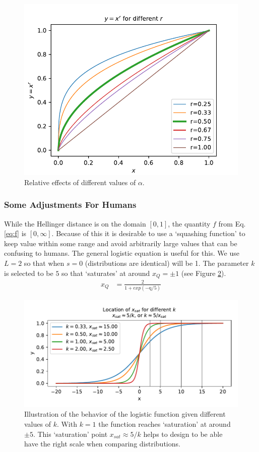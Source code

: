 \begin{figure}[tbp]
    \centering
    \includegraphics[width=0.90\linewidth]{Figures/power_comparison}
    \caption{Relative effects of different values of $\alpha$.}
    \label{fig:alphas}
\end{figure}

\subsubsection{Some Adjustments For Humans}
While the Hellinger distance is on the domain $[0,1]$, the quantity $f$ from Eq. \ref{eq:f} is $[0,\infty]$. Because of this it is desirable to use a `squashing function' to keep \xQ{} value within some range and avoid arbitrarily large values that can be confusing to humans. The general logistic equation is useful for this.
We use $L=2$ so that when $s=0$ (distributions are identical) \xQ{} will be 1. The parameter $k$ is selected to be $5$ so that \xQ{} `saturates' at around $x_Q=\pm1$ (see Figure \ref{fig:log_sat}).
\begin{align}
    x_{Q} &= \frac{2}{1+exp(-\text{q}/5)}\label{eq:SQ}
\end{align}
\begin{figure}[tbp]
    \centering
    \includegraphics[width=0.9\linewidth]{Figures/logistic_saturation}
    \caption{Illustration of the behavior of the logistic function given different values of $k$. With $k=1$ the function reaches `saturation' at around $\pm5$. This `saturation' point $x_{sat}\approx 5/k$ helps to design \xQ{} to be able have the right scale when comparing distributions.}
    \label{fig:log_sat}
\end{figure}

